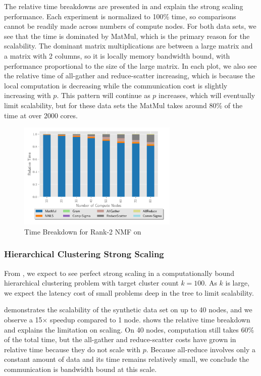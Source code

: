 The relative time breakdowns are presented in  and explain the strong scaling performance.
Each experiment is normalized to 100\% time, so comparisons cannot be readily made across numbers of compute nodes. 
For both data sets, we see that the time is dominated by MatMul, which is the primary reason for the scalability.
The dominant matrix multiplications are between a large matrix and a matrix with 2 columns, so it is locally memory bandwidth bound, with performance proportional to the size of the large matrix.
In each plot, we also see the relative time of all-gather and reduce-scatter increasing, which is because the local computation is decreasing while the communication cost is slightly increasing with $p$.
This pattern will continue as $p$ increases, which will eventually limit scalability, but for these data sets the MatMul takes around 80\% of the time at over 2000 cores.

\begin{figure}
\begin{center}
\includegraphics[height=2in, width=\columnwidth]{plots/realworld_rank2_strongscaling.pdf}
\caption{Time Breakdown for Rank-2 NMF on \image{} }
\label{fig:rwrank2strongscaling}
\end{center}
\end{figure}


\subsubsection{Hierarchical Clustering Strong Scaling}
\label{sec:hiernmf2scaling}

From , we expect to see perfect strong scaling in a computationally bound hierarchical clustering problem with target cluster count $k=100$.
As $k$ is large, we expect the latency cost of small problems deep in the tree to limit scalability.

 demonstrates the scalability of the synthetic data set on up to 40 nodes, and we observe a 15$\times$ speedup compared to 1 node.
 shows the relative time breakdown and explains the limitation on scaling.
On 40 nodes, computation still takes 60\% of the total time, but the all-gather and reduce-scatter costs have grown in relative time because they do not scale with $p$.
Because all-reduce involves only a constant amount of data and its time remains relatively small, we conclude the communication is bandwidth bound at this scale.

